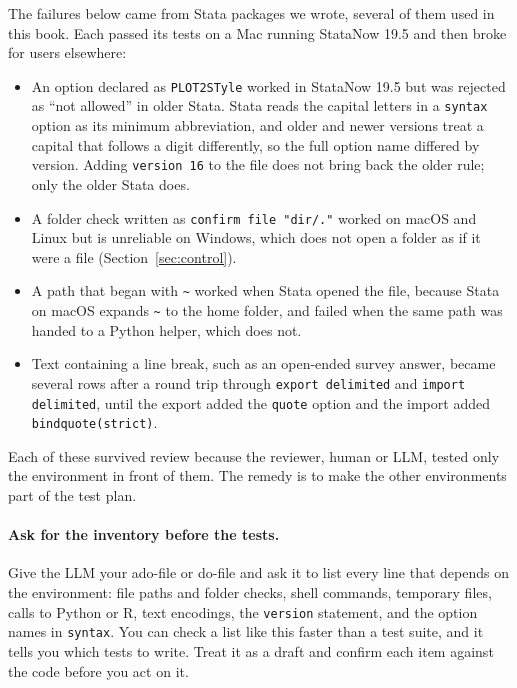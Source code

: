 The failures below came from Stata packages we wrote, several of them used in this book. Each passed its tests on a Mac running StataNow 19.5 and then broke for users elsewhere:
\begin{itemize}
\item An option declared as \texttt{PLOT2STyle} worked in StataNow 19.5 but was rejected as ``not allowed'' in older Stata. Stata reads the capital letters in a \texttt{syntax} option as its minimum abbreviation, and older and newer versions treat a capital that follows a digit differently, so the full option name differed by version. Adding \texttt{version 16} to the file does not bring back the older rule; only the older Stata does.
\item A folder check written as \texttt{confirm file "dir/."} worked on macOS and Linux but is unreliable on Windows, which does not open a folder as if it were a file (Section~\ref{sec:control}).
\item A path that began with \texttt{\textasciitilde} worked when Stata opened the file, because Stata on macOS expands \texttt{\textasciitilde} to the home folder, and failed when the same path was handed to a Python helper, which does not.
\item Text containing a line break, such as an open-ended survey answer, became several rows after a round trip through \texttt{export delimited} and \texttt{import delimited}, until the export added the \texttt{quote} option and the import added \texttt{bindquote(strict)}.
\end{itemize}
Each of these survived review because the reviewer, human or LLM, tested only the environment in front of them. The remedy is to make the other environments part of the test plan.

\paragraph{Ask for the inventory before the tests.} Give the LLM your ado-file or do-file and ask it to list every line that depends on the environment: file paths and folder checks, shell commands, temporary files, calls to Python or R, text encodings, the \texttt{version} statement, and the option names in \texttt{syntax}. You can check a list like this faster than a test suite, and it tells you which tests to write. Treat it as a draft and confirm each item against the code before you act on it.

